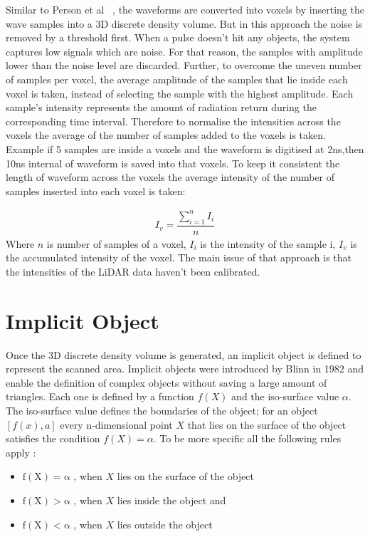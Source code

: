 \documentclass{subfiles}
\begin{document}
Similar to Person et al ~\cite{Persson2005}, the waveforms are converted into voxels by inserting the wave samples into a 3D discrete density volume. But in this approach the noise is removed by a threshold first. When a pulse doesn’t hit any objects, the system captures low signals which are noise. For that reason, the samples with amplitude lower than the noise level are discarded. Further, to overcome the uneven number of samples per voxel, the average amplitude of the samples that lie inside each voxel is taken, instead of selecting the sample with the highest amplitude. Each sample's intensity represents the amount of radiation return during the corresponding time interval. Therefore to normalise the intensities across the voxels the average of the number of samples added to the voxels is taken. Example if 5 samples are inside a voxels and the waveform is digitised at 2ns,then 10ns internal of waveform is saved into that voxels. To keep it consistent the length of waveform across the voxels the average intensity of the number of samples inserted into each voxel is taken: 

	\begin{eqnarray}
		I_{v} = \dfrac{\sum_{i=1}^{n}I_{i}}{n}
	\end{eqnarray} 
Where 	$n$ is number of samples of a voxel, 
	$I_{i}$ is the intensity of the sample i, 
	$I_{v}$ is the accumulated intensity of the voxel.  
The main issue of that approach is that the intensities of the LiDAR data haven’t been calibrated. 


\section{Implicit Object}

\par Once the 3D discrete density volume is generated, an implicit object is defined to represent the scanned area. Implicit objects were introduced by Blinn in 1982 \cite{Blinn1982} and enable the definition of complex objects without saving a large amount of triangles. Each one is defined by a function $ \mathit{f(X)} $ and the iso-surface value $\alpha$. The iso-surface value defines the boundaries of the object; for an object $ [f(x),a]$ every n-dimensional point $ \mathit{X} $  that lies on the surface of the object satisfies the condition $ \mathit{f(X)=\alpha }  $. To be more specific all the following rules apply \cite{Pasko1994}: 
\begin{itemize}
	\item $	\mathrm{f(X) = \alpha }$ , when $X$ lies on the surface of the object
	\item $	\mathrm{f(X) > \alpha }$ , when $X$ lies inside the object and
	\item $	\mathrm{f(X) < \alpha }$ , when $X$ lies outside the object	 
\end{itemize}
\end{document}
